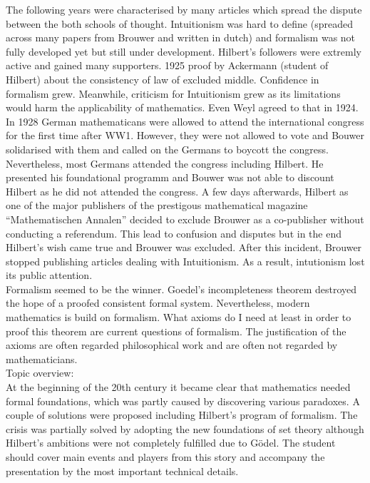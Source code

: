 \documentclass[hidelinks]{article}
\theoremstyle{plain}
\theoremstyle{definition}
\theoremstyle{rem}
\begin{document}
The following years were characterised by many articles which spread the dispute between the both schools of thought. Intuitionism was hard to define (spreaded across many papers from Brouwer and written in dutch) and formalism was not fully developed yet but still under development. Hilbert's followers were extremly active and gained many supporters. 1925 proof by Ackermann (student of Hilbert) about the consistency of law of excluded middle. Confidence in formalism grew. Meanwhile, criticism for Intuitionism grew as its limitations would harm the applicability of mathematics. Even Weyl agreed to that in 1924.\\

In 1928 German mathematicans were allowed to attend the international congress for the first time after WW1. However, they were not allowed to vote and Bouwer solidarised with them and called on the Germans to boycott the congress. Nevertheless, most Germans attended the congress including Hilbert. He presented his foundational programm and Bouwer was not able to discount Hilbert as he did not attended the congress. A few days afterwards, Hilbert as one of the major publishers of the prestigous mathematical magazine ``Mathematischen Annalen'' decided to exclude Brouwer as a co-publisher without conducting a referendum. This lead to confusion and disputes but in the end Hilbert's wish came true and Brouwer was excluded. After this incident, Brouwer stopped publishing articles dealing with Intuitionism. As a result, intutionism lost its public attention. \\

Formalism seemed to be the winner. Goedel's incompleteness theorem destroyed the hope of a proofed consistent formal system. Nevertheless, modern mathematics is build on formalism. What axioms do I need at least in order to proof this theorem are current questions of formalism. The justification of the axioms are often regarded philosophical work and are often not regarded by mathematicians.
\\



Topic overview:\\
At the beginning of the 20th century it became clear that mathematics needed formal foundations, which was partly caused by discovering various paradoxes. A couple of solutions were proposed including Hilbert's program of formalism. The crisis was partially solved by adopting the new foundations of set theory although Hilbert's ambitions were not completely fulfilled due to Gödel. The student should cover main events and players from this story and accompany the presentation by the most important technical details.
\end{document}
